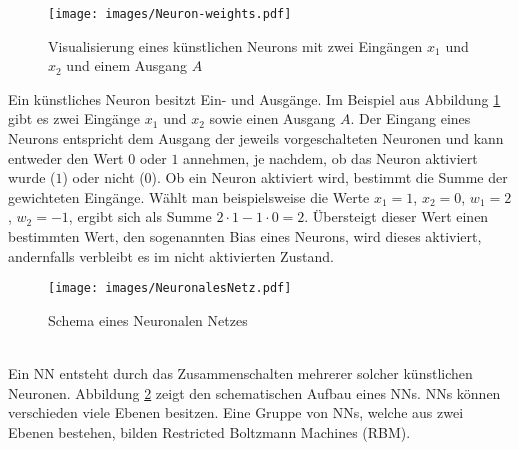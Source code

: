 \begin{figure}[h]
  \centering
  \texttt{[image: images/Neuron-weights.pdf]}
  \caption{Visualisierung eines künstlichen Neurons mit zwei Eingängen $x_1$ und $x_2$ und einem Ausgang $A$ \cite{ml}}
  \label{fig:nn-weights}
\end{figure}

\noindent Ein künstliches Neuron besitzt Ein- und Ausgänge. Im Beispiel aus Abbildung \ref{fig:nn-weights} gibt es zwei Eingänge $x_1$ und $x_2$ sowie einen Ausgang $A$. Der Eingang eines Neurons entspricht dem Ausgang der jeweils vorgeschalteten Neuronen und kann entweder den Wert $0$ oder $1$ annehmen, je nachdem, ob das Neuron aktiviert wurde ($1$) oder nicht ($0$). Ob ein Neuron aktiviert wird, bestimmt die Summe der gewichteten Eingänge.
Wählt man beispielsweise die Werte $x_1 = 1$, $x_2 = 0$, $w_1 =2$, $w_2 = -1$, ergibt sich als Summe $2\cdot1 - 1\cdot0 = 2$. Übersteigt dieser Wert einen bestimmten Wert, den sogenannten Bias eines Neurons, wird dieses aktiviert, andernfalls verbleibt es im nicht aktivierten Zustand.
\begin{figure}[!h]
  \centering
  \texttt{[image: images/NeuronalesNetz.pdf]}
  \caption{Schema eines Neuronalen Netzes \cite{ml}}
  \label{fig:nn}
\end{figure}
\\Ein NN entsteht durch das Zusammenschalten mehrerer solcher künstlichen Neuronen. Abbildung \ref{fig:nn} zeigt den schematischen Aufbau eines NNs.
NNs können verschieden viele Ebenen besitzen. Eine Gruppe von NNs, welche aus zwei Ebenen bestehen, bilden Restricted Boltzmann Machines (RBM). \cite{ml, Adachi15}

